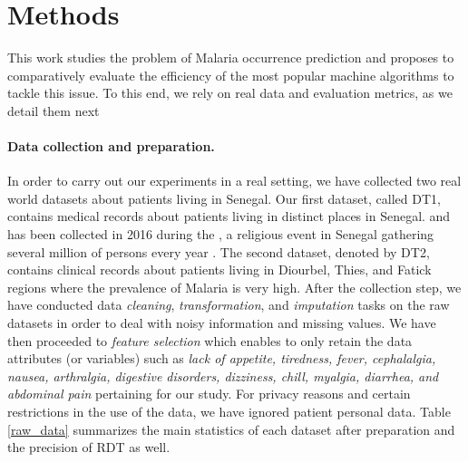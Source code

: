 \section{Methods}\label{Methods}
This work studies the problem of Malaria occurrence prediction and proposes to comparatively evaluate the efficiency of the most popular machine algorithms to tackle this issue. 
To this end, we rely on real data and evaluation metrics, as we detail them next 

\paragraph*{\bf Data collection and preparation.}
In order to carry out  our experiments in a real setting, we have collected two real world datasets about patients living in Senegal. Our first dataset, called DT1, contains medical records about patients living in distinct places in Senegal. and has been collected in 2016 during the \emph{},  a religious event in Senegal gathering several million of persons every year \cite{Ch17}.   The second dataset, denoted by DT2, contains clinical records about patients living in Diourbel, Thies, and Fatick regions where the prevalence of Malaria is very high. After the collection step, we have conducted data \emph{cleaning}, \emph{transformation}, and \emph{imputation} tasks on the raw datasets in order to deal with noisy information and missing values. We have then proceeded to \emph{feature selection} which enables to only retain the data attributes (or variables) such as \emph{lack of appetite, tiredness, fever, cephalalgia, nausea, arthralgia, digestive disorders, dizziness, chill, myalgia, diarrhea, and abdominal pain} pertaining for our study.
For privacy reasons and certain restrictions in the use of the data, we have ignored patient personal data.
Table \ref{raw_data} summarizes the main statistics of each dataset after preparation and the precision of RDT as well. 
\begin{table}[h]
  \caption{Main statistics of real datasets DT1 and DT2}\label{raw_data}
\end{table}
